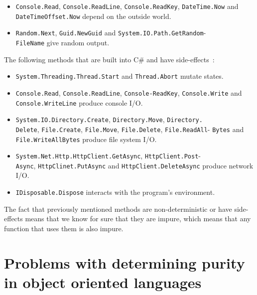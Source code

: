 \documentclass[a4paper,12pt]{article}
\begin{document}
\begin{itemize}
  \item \texttt{Console.Read}, \texttt{Console.ReadLine}, \texttt{Console.ReadKey}, \texttt{DateTime\allowbreak.Now} and \texttt{DateTimeOffset.Now} depend on the outside world.
\item \texttt{Random.Next}, \texttt{Guid.NewGuid} and \texttt{System.IO.Path.GetRandom}-\\\texttt{\allowbreak FileName} give random output.
\end{itemize}


The following methods that are built into C\# and have side-effects~\cite{dixin2015}:

\begin{itemize}
  \item \texttt{System.Threading.Thread.Start} and \texttt{Thread.Abort} mutate states.
  \item \texttt{Console.Read}, \texttt{Console.ReadLine}, \texttt{Console-ReadKey}, \texttt{Console.\allowbreak Write} and \texttt{Console.WriteLine} produce console I/O.
  \item \texttt{System.IO.Directory.Create}, \texttt{Directory.Move}, \texttt{Directory.}\\\texttt{Delete}, \texttt{File.Create}, \texttt{File.Move}, \texttt{File.Delete}, \texttt{File.ReadAll\allowbreak }- \texttt{Bytes} and \texttt{File.WriteAllBytes} produce file system I/O.
\item \texttt{System.Net.Http.HttpClient.GetAsync}, \texttt{HttpClient.Post}- \\\texttt{Async}, \texttt{HttpClinet.PutAsync} and \texttt{HttpClient.DeleteAsync} produce network I/O.
  \item \texttt{IDisposable.Dispose} interacts with the program's environment.
\end{itemize}

The fact that previously mentioned methods are non-deterministic or have side-effects means that we know for sure that they are impure, which means that any function that uses them is also impure.

\section{Problems with determining purity in object oriented languages} \label{sec:Problems with determining purity in object oriented languages}
\end{document}
